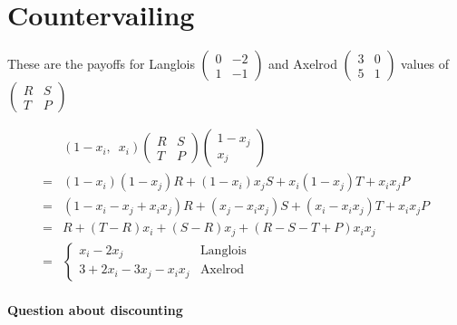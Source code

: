 

\chapter{Countervailing}

These are the payoffs for Langlois
$\left(
	\begin{array}{cc}
		0 & -2 \\
		1 & -1
	\end{array}
\right)
$
and Axelrod
$
\left(
	\begin{array}{cc}
		3 & 0 \\
		5 & 1
	\end{array}
\right)
$
values of
$
\left(
	\begin{array}{cc}
		R & S \\
		T & P
	\end{array}
\right)
$

\begin{align*}
&(1-x_i,\enspace x_i) 
\left(
	\begin{array}{cc}
		R & S \\
		T & P
	\end{array}
\right)
\left(
	\begin{array}{c}
	1-x_j \\
	x_j
	\end{array}
\right)
\\
= &(1-x_i)(1-x_j) R + (1-x_i)x_j S + x_i(1-x_j)T + x_i x_j P
\\
= &(1 - x_i - x_j + x_i x_j)R + (x_j - x_i x_j)S + (x_i - x_i x_j)T + x_i x_j P
\\
= &R + (T-R)x_i + (S-R)x_j  + (R - S - T + P)x_ix_j \\
=& \begin{cases}
	x_i - 2x_j			& \textrm{Langlois}	\\
	3 + 2x_i - 3x_j - x_i x_j 	&\textrm{Axelrod}
      \end{cases}
\end{align*}


\subsubsection{Question about discounting}

